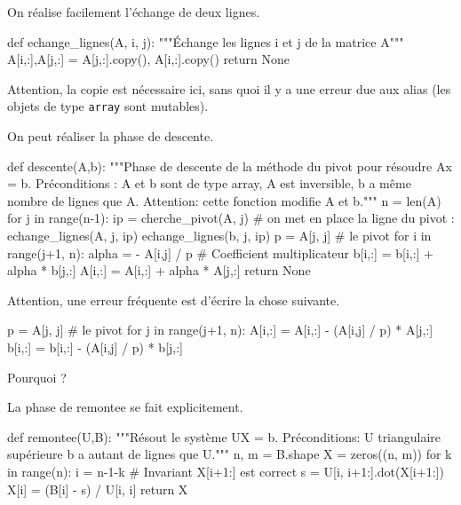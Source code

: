 \medskip{}

On réalise facilement l'échange de deux lignes.
\begin{pyverbatim}
def echange_lignes(A, i, j):
    """Échange les lignes i et j de la matrice A"""
    A[i,:],A[j,:] = A[j,:].copy(), A[i,:].copy()
    return None
\end{pyverbatim}
Attention, la copie est nécessaire ici, sans quoi il y a une erreur due aux alias (les objets de type \texttt{array} sont mutables).



\medskip{}

On peut réaliser la phase de descente.
\begin{pyverbatim}
def descente(A,b):
    """Phase de descente de la méthode du pivot pour résoudre Ax = b.
    Préconditions : A et b sont de type array,
                    A est inversible,
                    b a même nombre de lignes que A.
    Attention: cette fonction modifie A et b."""
    n = len(A)
    for j in range(n-1):
        ip = cherche_pivot(A, j)
        # on met en place la ligne du pivot :
        echange_lignes(A, j, ip)
        echange_lignes(b, j, ip)
        p = A[j, j] # le pivot
        for i in range(j+1, n):
            alpha = - A[i,j] / p # Coefficient multiplicateur
            b[i,:] = b[i,:] + alpha * b[j,:]
            A[i,:] = A[i,:] + alpha * A[j,:]
    return None
\end{pyverbatim}


\medskip{}

\begin{rem}
Attention, une erreur fréquente est d'écrire la chose suivante. 
\begin{pyverbatim}
        p = A[j, j] # le pivot
        for j in range(j+1, n):
            A[i,:] = A[i,:] - (A[i,j] / p) * A[j,:]
            b[i,:] = b[i,:] - (A[i,j] / p) * b[j,:]
\end{pyverbatim}
Pourquoi ? 
\end{rem}

\medskip{}

La phase de remontee se fait explicitement.
\begin{pyverbatim}
def remontee(U,B):
    """Résout le système UX = b.
    Préconditions: U triangulaire supérieure
                   b a autant de lignes que U."""
    n, m = B.shape
    X = zeros((n, m))
    for k in range(n):
        i = n-1-k
        # Invariant X[i+1:] est correct
        s = U[i, i+1:].dot(X[i+1:])
        X[i] = (B[i] - s) / U[i, i]
    return X
\end{pyverbatim}

